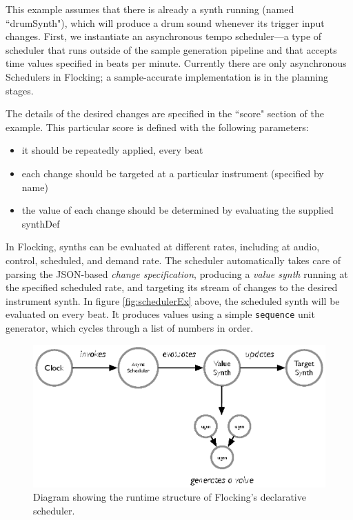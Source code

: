 \documentclass{article}
\begin{document}
This example assumes that there is already a synth running (named ``drumSynth"), which will produce a drum sound whenever its trigger input changes. First, we instantiate an asynchronous tempo scheduler---a type of scheduler that runs outside of the sample generation pipeline and that accepts time values specified in beats per minute. Currently there are only asynchronous Schedulers in Flocking; a sample-accurate implementation is in the planning stages.

The details of the desired changes are specified in the ``score" section of the example. This particular score is defined with the following parameters:

\begin{itemize}
\item it should be repeatedly applied, every beat
\item each change should be targeted at a particular instrument (specified by name)
\item the value of each change should be determined by evaluating the supplied synthDef
\end{itemize}

In Flocking, synths can be evaluated at different rates, including at audio, control, scheduled, and demand rate. The scheduler automatically takes care of parsing the JSON-based {\it change specification}, producing a {\it value synth} running at the specified scheduled rate, and targeting its stream of changes to the desired instrument synth. In figure \ref{fig:schedulerEx} above, the scheduled synth will be evaluated on every beat. It produces values using a simple \verb|sequence| unit generator, which cycles through a list of numbers in order.

\begin{figure}[ht]
\centering
\includegraphics[width=0.9\columnwidth]{images/scheduler.eps}
\caption{ Diagram showing the runtime structure of Flocking's declarative scheduler.\label{fig:scheduler}}
\end{figure}
\end{document}
